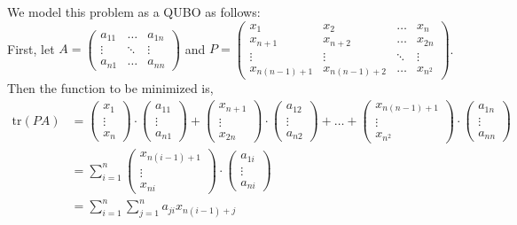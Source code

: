 \documentclass{article}
\begin{document}
\noindent We model this problem as a QUBO as follows: \\ 

\noindent First, let \(A = \begin{pmatrix}
    a_{11} & \hdots & a_{1n} \\
    \vdots & \ddots & \vdots \\
    a_{n1} & \hdots & a_{nn}
\end{pmatrix}\) and \(P = \begin{pmatrix}
    x_{1} & x_2 & \hdots & x_{n} \\
    x_{n + 1} & x_{n + 2} & \hdots & x_{2n} \\
    \vdots & \vdots & \ddots & \vdots \\
    x_{n(n-1)+1} & x_{n(n-1)+2} & \hdots & x_{n^2}
\end{pmatrix}\).
Then the function to be minimized is,
\begin{align*}
    \text{tr} (PA) &= \begin{pmatrix}
        x_1 \\
        \vdots \\
        x_n
    \end{pmatrix} \cdot \begin{pmatrix}
        a_{11}\\
        \vdots \\
        a_{n1}
    \end{pmatrix} + \begin{pmatrix}
        x_{n+1} \\
        \vdots \\
        x_{2n}
    \end{pmatrix} \cdot \begin{pmatrix}
        a_{12}\\
        \vdots \\
        a_{n2}
    \end{pmatrix} + \hdots + \begin{pmatrix}
        x_{n(n-1) + 1} \\
        \vdots \\
        x_{n^2}
    \end{pmatrix} \cdot \begin{pmatrix}
        a_{1n}\\
        \vdots \\
        a_{nn}
    \end{pmatrix} \\
    &= \sum_{i=1}^{n} \begin{pmatrix}
        x_{n(i-1) + 1} \\
        \vdots \\
        x_{ni}
    \end{pmatrix} \cdot \begin{pmatrix}
        a_{1i} \\
        \vdots \\
        a_{ni}
    \end{pmatrix} \\
    &= \sum_{i=1}^{n} \sum_{j=1}^{n} a_{ji}x_{n(i-1)+j}
\end{align*}
\end{document}
